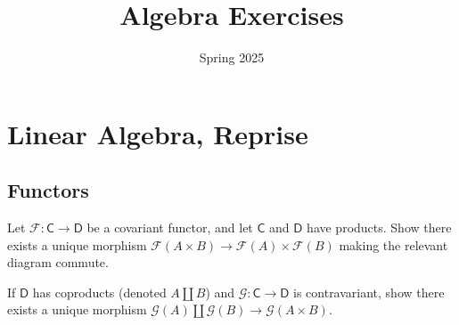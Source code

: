 \documentclass[11pt]{report}
\title{Algebra Exercises}
\date{Spring 2025}
\begin{document}
\makereport
{}
\chapter{Linear Algebra, Reprise}
\section{Functors}
\begin{exercise}
	Let $\mathscr{F} : \mathsf{C}  \to \mathsf{D} $ be a covariant functor, and let $\mathsf{C} $ and $\mathsf{D} $ have products. Show there exists a unique morphism $\mathscr{F} (A\times B)\to \mathscr{F} (A)\times \mathscr{F} (B)$ making the relevant diagram commute.

	If $\mathsf{D} $ has coproducts (denoted $A \amalg B$) and $\mathscr{G} : \mathsf{C}  \to \mathsf{D} $ is contravariant, show there exists a unique morphism $\mathscr{G}(A)\amalg \mathscr{G} (B)\to \mathscr{G} (A\times B)$.
\end{exercise}
\end{document}
